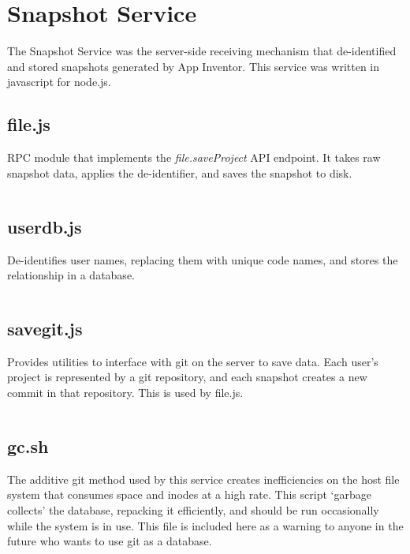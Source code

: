 \inputminted[firstline=626, lastline=651]{java}{src/appinventor/BlocklyPanel.java}
\inputminted[firstline=902, lastline=913, breakbefore=.]{java}{src/appinventor/BlocklyPanel.java}

\section{Snapshot Service}
\label{src:snapshot-service}
The Snapshot Service was the server-side receiving mechanism that de-identified and stored snapshots generated by App Inventor. This service was written in javascript for node.js.

\subsection{file.js}
\label{src:file.js}
RPC module that implements the \emph{file.saveProject} API endpoint. It takes raw snapshot data, applies the de-identifier, and saves the snapshot to disk.
\inputminted{javascript}{src/snapshot-service/file.js}

\subsection{userdb.js}
\label{src:userdb.js}
De-identifies user names, replacing them with unique code names, and stores the relationship in a database.
\inputminted{javascript}{src/snapshot-service/userdb.js}

\subsection{savegit.js}
\label{src:savegit.js}
Provides utilities to interface with git on the server to save data. Each user's project is represented by a git repository, and each snapshot creates a new commit in that repository. This is used by file.js.
\inputminted{javascript}{src/snapshot-service/savegit.js}

\subsection{gc.sh}
\label{src:gc.sh}
The additive git method used by this service creates inefficiencies on the host file system that consumes space and inodes at a high rate. This script `garbage collects' the database, repacking it efficiently, and should be run occasionally while the system is in use. This file is included here as a warning to anyone in the future who wants to use git as a database.
\inputminted{bash}{src/snapshot-service/gc.sh}